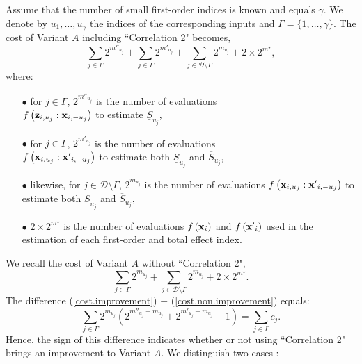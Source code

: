 Assume that the number of small first-order indices is known and equals $\gamma$. We denote by $u_1,\dots,u_{\gamma}$ the indices of the corresponding inputs and $\Gamma = \{1,\dots,\gamma\}$. The cost of Variant $A$ including ``Correlation 2" becomes, 
\begin{equation}
\sum \limits_{j \in \Gamma} 2^{m''_{u_j}} + \sum \limits_{j \in \Gamma} 2^{m'_{u_j}} + \sum \limits_{j \in \mathcal{D}\setminus{\Gamma}} 2^{m_{u_j}} + 2 \times 2^{m^\star},
\label{cost.improvement}
\end{equation}
where: %
\begin{itemize}
\item[$\bullet$] for $j\in \Gamma$, $2^{m''_{u_j}}$ is the number of evaluations \\ $f\left(\boldsymbol{\mathbf{z}}_{i,u_j}:\boldsymbol{\mathbf{x}}_{i,-u_j}\right)$ to estimate $\underline{S}_{u_j}$,
\item[$\bullet$] for $j\in \Gamma$, $2^{m'_{u_j}}$ is the number of evaluations \\ $f\left(\boldsymbol{\mathbf{x}}_{i,u_j}:{\boldsymbol{\mathbf{x}}'}_{i,-u_j}\right)$ to estimate both $\underline{S}_{u_j}$ and  $\overline{S}_{u_j}$,
\item[$\bullet$] likewise, for $j\in \mathcal{D}\setminus{\Gamma}$, $ 2^{m_{u_j}}$ is the number of evaluations $f\left(\boldsymbol{\mathbf{x}}_{i,u_j}:{\boldsymbol{\mathbf{x}}'}_{i,-u_j}\right)$ to estimate both $\underline{S}_{u_j}$ and  $\overline{S}_{u_j}$,
\item[$\bullet$] $2 \times 2^{m^{\star}}$ is the number of evaluations $f\left(\boldsymbol{\mathbf{x}}_{i}\right)$ and $f\left({\boldsymbol{\mathbf{x}}'}_{i}\right)$ used in the estimation of each first-order and total effect index.
\end{itemize}
We recall the cost of Variant $A$ without  ``Correlation 2",
\begin{equation}
\sum \limits_{j \in \Gamma} 2^{m_{u_j}} + \sum \limits_{j \in \mathcal{D}\setminus{\Gamma}} 2^{m_{u_j}} + 2 \times 2^{m^{\star}}. 
\label{cost.non.improvement}
\end{equation}
The difference (\ref{cost.improvement}) $-$ (\ref{cost.non.improvement}) equals:
\begin{equation}
 \sum \limits_{j \in \Gamma} 2^{m_{u_j}} \left(2^{m''_{u_j}-m_{u_j}}  + 2^{m'_{u_j}-m_{u_j}} - 1 \right) = \sum \limits_{j \in \Gamma} c_j.
\label{cost.comparison}
\end{equation}
Hence, the sign of this difference indicates whether or not using ``Correlation 2" brings an improvement to Variant $A$. We distinguish two cases :
